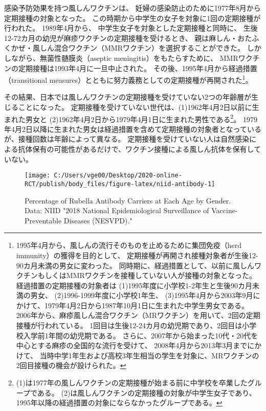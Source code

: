 \documentclass[
  11pt,
  a4paper,
]{article}
\begin{document}
感染予防効果を持つ風しんワクチンは、
妊婦の感染防止のために1977年8月から定期接種の対象となった。
この時期から中学生の女子を対象に1回の定期接種が行われた。
1989年4月から、
中学生女子を対象とした定期接種と同時に、
生後12-72カ月の幼児が麻疹ワクチンの定期接種を受けるとき、
親は麻しん・おたふくかぜ・風しん混合ワクチン（MMRワクチン）を選択することができた。
しかしながら、無菌性髄膜炎（aseptic meningitis）をもたらすために、
MMRワクチンの定期接種は1993年4月に一旦中止された。
その後、1995年4月から経過措置（transitional measures）とともに努力義務としての定期接種が再開された\footnote{1995年4月から、風しんの流行そのものを止めるために集団免疫（herd immunity）の獲得を目的として、
  定期接種が再開され接種対象者が生後12-90カ月未満の男女に変わった。
  同時期に、経過措置として、以前に風しんワクチンもしくはMMRワクチンを接種していない人が接種の対象となった。
  経過措置の定期接種の対象者は
  (1)1995年度に小学校1-2年生と生後90カ月未満の男女、
  (2)1996-1999年度に小学校1年生、
  (3)1995年4月から2003年9月にかけて、1979年4月2日から1987年10月1日に生まれた中学生男女である。
  2006年から、麻疹風しん混合ワクチン（MRワクチン）を用いて、2回の定期接種が行われている。
  1回目は生後12-24カ月の幼児期であり、2回目は小学校入学前1年間の幼児期である。
  さらに、2007年から始まった10代・20代を中心とする麻疹の全国的な流行を受けて、
  2008年4月から2013年3月までにかけて、
  当時中学1年生および高校3年生相当の学生を対象に、MRワクチンの2回目接種の機会が設けられた。}。

その結果、日本では風しんワクチンの定期接種を受けていない2つの年齢層が生じることになった。
定期接種を受けていない世代は、(1)1962年4月2日以前に生まれた男女と
(2)1962年4月2日から1979年4月1日に生まれた男性である\footnote{(1)は1977年の風しんワクチンの定期接種が始まる前に中学校を卒業したグループである。
  (2)は風しんワクチンの定期接種の対象が中学生女子であり、1995年以降の経過措置の対象にならなかったグループである。}。
1979年4月2日以降に生まれた男女は経過措置を含めて定期接種の対象者となっているが、接種回数は年齢によって異なる。
定期接種を受けていない人は自然感染による抗体保有の可能性があるだけで、ワクチン接種による風しん抗体を保有していない。

\begin{figure}[t]
\texttt{[image: C:/Users/vge00/Desktop/2020-online-RCT/publish/body\_files/figure-latex/niid-antibody-1]} \caption{Percentage of Rubella Antibody Carriers at Each Age by Gender. Data: NIID "2018 National Epidemiological Surveillance of Vaccine-Preventable Diseases (NESVPD)."}\label{fig:niid-antibody}
\end{figure}
\end{document}
